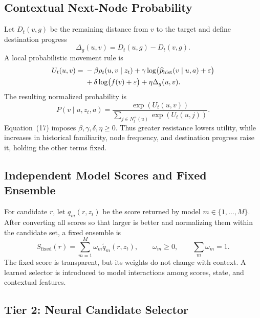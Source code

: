 \documentclass[11pt,letterpaper]{article}
\begin{document}
\subsection{Contextual Next-Node Probability}

Let $D_t(v,g)$ be the remaining distance from $v$ to the target and define destination progress
\begin{equation}
\Delta_g(u,v)=D_t(u,g)-D_t(v,g).
\end{equation}
A local probabilistic movement rule is
\begin{align}
U_t(u,v)={}&-\beta\rho_t(u,v\mid z_t)
+\gamma\log\bigl(\widehat p_{\mathrm{hist}}(v\mid u,a)+\varepsilon\bigr)\notag\\
&+\delta\log\bigl(f(v)+\varepsilon\bigr)+\eta\Delta_g(u,v).
\end{align}
The resulting normalized probability is
\begin{equation}
P(v\mid u,z_t,a)=
\frac{\exp(U_t(u,v))}{\sum_{j\in N_t^+(u)}\exp(U_t(u,j))}.
\end{equation}
Equation~(17) imposes $\beta,\gamma,\delta,\eta\geq0$. Thus greater resistance lowers utility, while increases in historical familiarity, node frequency, and destination progress raise it, holding the other terms fixed.

\subsection{Independent Model Scores and Fixed Ensemble}

For candidate $r$, let $q_m(r,z_t)$ be the score returned by model $m\in\{1,\ldots,M\}$. After converting all scores so that larger is better and normalizing them within the candidate set, a fixed ensemble is
\begin{equation}
S_{\mathrm{fixed}}(r)=\sum_{m=1}^{M}\omega_m\widetilde q_m(r,z_t),
\qquad \omega_m\geq0, \qquad \sum_m\omega_m=1.
\end{equation}
The fixed score is transparent, but its weights do not change with context. A learned selector is introduced to model interactions among scores, state, and contextual features.

\subsection{Tier 2: Neural Candidate Selector}
\end{document}
